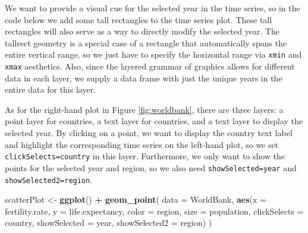 \documentclass[12pt,]{article}
\newenvironment{Shaded}{\begin{snugshade}}{\end{snugshade}}
\newcommand{\DataTypeTok}[1]{\textcolor[rgb]{0.13,0.29,0.53}{#1}}
\newcommand{\FloatTok}[1]{\textcolor[rgb]{0.00,0.00,0.81}{#1}}
\newcommand{\KeywordTok}[1]{\textcolor[rgb]{0.13,0.29,0.53}{\textbf{#1}}}
\newcommand{\NormalTok}[1]{#1}
\newcommand{\OperatorTok}[1]{\textcolor[rgb]{0.81,0.36,0.00}{\textbf{#1}}}
\newcommand{\StringTok}[1]{\textcolor[rgb]{0.31,0.60,0.02}{#1}}
\theoremstyle{definition}
\theoremstyle{definition}
\theoremstyle{definition}
\theoremstyle{remark}
\begin{document}
We want to provide a visual cue for the selected year in the time
series, so in the code below we add some tall rectangles to the time
series plot. These tall rectangles will also serve as a way to directly
modify the selected year. The tallrect geometry is a special case of a
rectangle that automatically spans the entire vertical range, so we just
have to specify the horizontal range via \texttt{xmin} and \texttt{xmax}
aesthetics. Also, since the layered grammar of graphics allows for
different data in each layer, we supply a data frame with just the
unique years in the entire data for this layer.

\begin{Shaded}
\end{Shaded}

As for the right-hand plot in Figure \ref{fig:worldbank}, there are
three layers: a point layer for countries, a text layer for countries,
and a text layer to display the selected year. By clicking on a point,
we want to display the country text label and highlight the
corresponding time series on the left-hand plot, so we set
\texttt{clickSelects=country} in this layer. Furthermore, we only want
to show the points for the selected year and region, so we also need
\texttt{showSelected=year} and \texttt{showSelected2=region}.

\begin{Shaded}
\begin{Highlighting}[]
\NormalTok{scatterPlot <-}\StringTok{ }\KeywordTok{ggplot}\NormalTok{() }\OperatorTok{+}\StringTok{ }\KeywordTok{geom_point}\NormalTok{(}
  \DataTypeTok{data =}\NormalTok{ WorldBank,}
  \KeywordTok{aes}\NormalTok{(}\DataTypeTok{x =}\NormalTok{ fertility.rate, }\DataTypeTok{y =}\NormalTok{ life.expectancy,}
      \DataTypeTok{color =}\NormalTok{ region, }\DataTypeTok{size =}\NormalTok{ population,}
      \DataTypeTok{clickSelects =}\NormalTok{ country,}
      \DataTypeTok{showSelected =}\NormalTok{ year,}
      \DataTypeTok{showSelected2 =}\NormalTok{ region)}
\NormalTok{)}
\end{Highlighting}
\end{Shaded}
\end{document}
